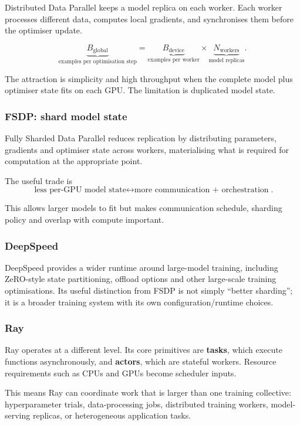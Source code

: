 Distributed Data Parallel keeps a model replica on each worker.
Each worker processes different data, computes local gradients, and synchronises them before the optimiser update.

\[
\underbrace{B_{\text{global}}}_{\text{examples per optimisation step}}
=
\underbrace{B_{\text{device}}}_{\text{examples per worker}}
\times
\underbrace{N_{\text{workers}}}_{\text{model replicas}}.
\]

The attraction is simplicity and high throughput when the complete model plus optimiser state fits on each GPU.
The limitation is duplicated model state.

\subsubsection*{FSDP: shard model state}

Fully Sharded Data Parallel reduces replication by distributing parameters, gradients and optimiser state across workers, materialising what is required for computation at the appropriate point.

The useful trade is
\[
\boxed{
\text{less per-GPU model state}
\leftrightarrow
\text{more communication + orchestration}
}.
\]

This allows larger models to fit but makes communication schedule, sharding policy and overlap with compute important.

\subsubsection*{DeepSpeed}

DeepSpeed provides a wider runtime around large-model training, including ZeRO-style state partitioning, offload options and other large-scale training optimisations.
Its useful distinction from FSDP is not simply ``better sharding''; it is a broader training system with its own configuration/runtime choices.

\subsubsection*{Ray}

Ray operates at a different level.
Its core primitives are \textbf{tasks}, which execute functions asynchronously, and \textbf{actors}, which are stateful workers.
Resource requirements such as CPUs and GPUs become scheduler inputs.

This means Ray can coordinate work that is larger than one training collective:
hyperparameter trials, data-processing jobs, distributed training workers, model-serving replicas, or heterogeneous application tasks.

